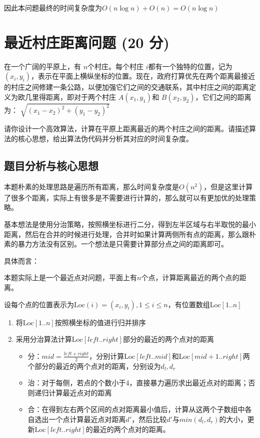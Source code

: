 \documentclass{article}
\begin{document}
因此本问题最终的时间复杂度为$O(n\log n) + O(n) = O(n \log n)$


\section{最近村庄距离问题 (20 分)}

在一个广阔的平原上，有 $n $个村庄。每个村庄 $i $都有一个独特的位置，记为 $(x_i, y_i)$，表示在平面上横纵坐标的位置。现在，政府打算优先在两个距离最接近的村庄之间修建一条公路，以便加强它们之间的交通联系，其中村庄之间的距离定义为欧几里得距离，即对于两个村庄 $A(x_1, y_1)$和 $B(x_2, y_2)$，它们之间的距离为： $\sqrt{(x_1 − x_2)^2 + (y_1 − y_2)^2}$

请你设计一个高效算法，计算在平原上距离最近的两个村庄之间的距离。请描述算法的核心思想，给出算法伪代码并分析其对应的时间复杂度。

\subsection{题目分析与核心思想}

本题朴素的处理思路是遍历所有距离，那么时间复杂度是$O(n^2)$，但是这里计算了很多个距离，实际上有很多是不需要进行计算的，那么就可以有更加优的处理策略。

基本想法是使用分治策略，按照横坐标进行二分，得到左半区域与右半取悦的最小距离，然后在合并的时候进行处理，合并时如果计算两侧所有点的距离，那么跟朴素的暴力方法没有区别。一个想法是只需要计算部分点之间的距离即可。

具体而言：

本题实际上是一个最近点对问题，平面上有$n$个点，计算距离最近的两个点的距离。

设每个点的位置表示为$\text{Loc}(i) = (x_i, y_i), 1\le i\le n$，有位置数组$\text{Loc}[1..n]$

\begin{enumerate}
    \item 将$\text{Loc}[1..n]$按照横坐标的值进行归并排序
    \item 采用分治算法计算$\text{Loc}[left..right]$部分的最近的两个点对的距离
    \begin{itemize}
        \item 分：$mid = \frac{left + right}{2}$，分别计算$\text{Loc}[left..mid]$和$\text{Loc}[mid+1..right]$两个部分的最近的两个点对的距离，分别设为$d_l, d_r$
        \item 治：对于每侧，若点的个数小于4，直接暴力遍历求出最近点对的距离；否则递归计算最近点对的距离
        \item 合：在得到左右两个区间的点对距离最小值后，计算从这两个子数组中各自选出一个点计算最近点对距离$d'$，然后比较$d'$与$min(d_l, d_r)$的大小，更新$\text{Loc}[left..right]$的最近的两个点对的距离。
    \end{itemize}
\end{enumerate}
\end{document}
